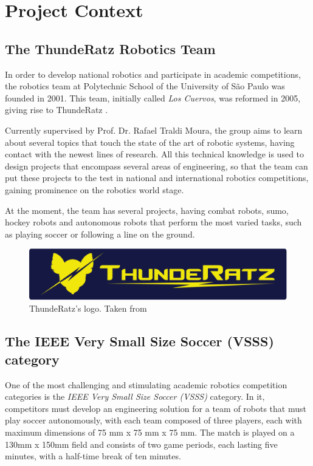 \section{Project Context}

\subsection{The ThundeRatz Robotics Team}

In order to develop national robotics and participate in academic competitions, the robotics team at Polytechnic School of the University of São Paulo was founded in 2001. This team, initially called \textit{Los Cuervos}, was reformed in 2005, giving rise to ThundeRatz \cite{ThundeRatz}.

Currently supervised by Prof. Dr. Rafael Traldi Moura, the group aims to learn about several topics that touch the state of the art of robotic systems, having contact with the newest lines of research. All this technical knowledge is used to design projects that encompass several areas of engineering, so that the team can put these projects to the test in national and international robotics competitions, gaining prominence on the robotics world stage.

At the moment, the team has several projects, having combat robots, sumo, hockey robots and autonomous robots that perform the most varied tasks, such as playing soccer or following a line on the ground.

\begin{figure}[!h]
    \centering
    \includegraphics[width=.6\linewidth]{images/ThundeRatz Logo.png}
    \caption{ThundeRatz's logo. Taken from \cite{ThundeRatz}}
\end{figure}

\subsection{The IEEE Very Small Size Soccer (VSSS) category}

One of the most challenging and stimulating academic robotics competition categories is the \textit{IEEE Very Small Size Soccer (VSSS)} category. In it, competitors must develop an engineering solution for a team of robots that must play soccer autonomously, with each team composed of three players, each with maximum dimensions of 75 mm x 75 mm x 75 mm. The match is played on a 130mm x 150mm field and consists of two game periods, each lasting five minutes, with a half-time break of ten minutes.

